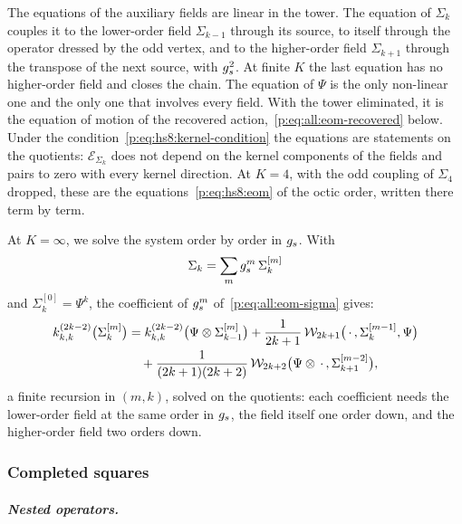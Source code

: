 The equations of the auxiliary fields are linear in the tower.
The equation of $\Sigma_k$ couples it to the lower-order field $\Sigma_{k - 1}$ through its source, to itself through the operator dressed by the odd vertex, and to the higher-order field $\Sigma_{k + 1}$ through the transpose of the next source, with $g_s^2$.
At finite $K$ the last equation has no higher-order field and closes the chain.
The equation of $\Psi$ is the only non-linear one and the only one that involves every field.
With the tower eliminated, it is the equation of motion of the recovered action,~\eqref{p:eq:all:eom-recovered} below.
Under the condition~\eqref{p:eq:hs8:kernel-condition} the equations are statements on the quotients: $\mathcal E_{\Sigma_k}$ does not depend on the kernel components of the fields and pairs to zero with every kernel direction.
At $K = 4$, with the odd coupling of $\Sigma_4$ dropped, these are the equations~\eqref{p:eq:hs8:eom} of the octic order, written there term by term.

At $K = \infty$, we solve the system order by order in $g_s$.
With
\begin{equation}
  \Sigma_k
    = \sum_m g_s^m \, \Sigma_k^{[m]}
\end{equation}
and $\Sigma_k^{[0]} = \Psi^k$, the coefficient of $g_s^m$ of~\eqref{p:eq:all:eom-sigma} gives:
\begin{equation}
\label{p:eq:all:eom-orders}
\begin{aligned}
  \kin{k}{}{2 k - 2}\big( \Sigma_k^{[m]} \big)
    &
    = \kin{k}{}{2 k - 2}\big( \Psi \otimes \Sigma_{k - 1}^{[m]} \big)
      + \frac{1}{2 k + 1} \, \dvertex{2 k + 1}\big( \, \cdot \,, \Sigma_k^{[m - 1]}, \Psi \big)
  \\ &
  \quad
      + \frac{1}{(2 k + 1) (2 k + 2)} \, \dvertex{2 k + 2}\big( \Psi \otimes \, \cdot \,, \Sigma_{k + 1}^{[m - 2]} \big),
\end{aligned}
\end{equation}
a finite recursion in $(m, k)$, solved on the quotients: each coefficient needs the lower-order field at the same order in $g_s$, the field itself one order down, and the higher-order field two orders down.

\subsubsection{Completed squares}
\label{p:sec:all:squares}

\subparagraph{Nested operators.}

